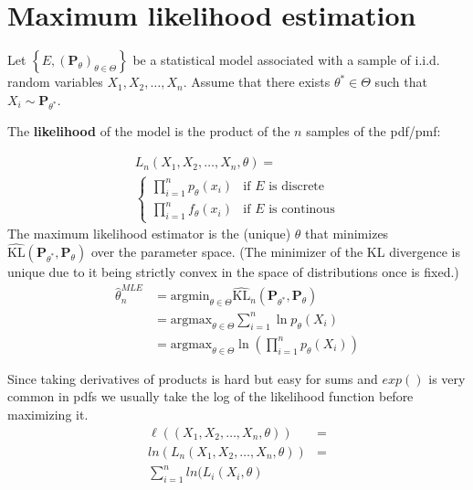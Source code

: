 \section{Maximum likelihood estimation}

Let $\left\{ E,\left(\mathbf{P}_{\theta }\right)_{\theta \in \Theta }\right\}$  be a statistical model associated with a sample of i.i.d. random variables $X_1, X_2, \dots , X_ n$. Assume that there exists $\theta ^* \in \Theta$ such that $X_ i \sim \mathbf{P}_{\theta ^*}$.

The \textbf{likelihood} of the model is the product of the $n$ samples of the pdf/pmf:

\begin{align*}
L_n{(X_1, X_2, \dots , X_ n, \theta)} = \\
{\begin{cases}
    \displaystyle \prod_{i=1}^np_\theta(x_i) & \text{if }E\text{ is discrete} \\
    \displaystyle \prod_{i=1}^nf_\theta(x_i) & \text{if }E\text{ is continous}
\end{cases}}
\end{align*}
The maximum likelihood estimator is the (unique) $\theta$ that minimizes $\widehat{\text {KL}}\left(\mathbf{P}_{\theta ^*}, \mathbf{P}_{\theta }\right)$ over the parameter space. (The minimizer of the KL divergence is unique due to it being strictly convex in the space of distributions once  is fixed.)
\begin{align*}
\widehat{\theta }_ n^{MLE}& = \displaystyle \text {argmin}_{\theta \in \Theta }\widehat{\text {KL}}_ n\left(\mathbf{P}_{\theta ^*}, \mathbf{P}_{\theta }\right)\\
&= \displaystyle \text {argmax}_{\theta \in \Theta } \sum _{i=1}^{n} \ln p_{\theta }(X_ i)\\  
&= \displaystyle \text {argmax}_{\theta \in \Theta } \ln \left(\prod _{i=1}^{n} p_{\theta }(X_ i)\right)
\end{align*}

Since taking derivatives of products is hard but easy for sums and $exp()$ is very common in pdfs we usually take the log of the likelihood function before maximizing it.
\begin{align*}
\ell((X_1, X_2, \dots , X_ n, \theta)) &=\\ 
ln(L_n{(X_1, X_2, \dots , X_ n, \theta)})&=\\
\sum_{i=1}^n  ln(L_i(X_i,\theta)
\end{align*}

